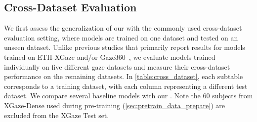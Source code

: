 \begin{table}[t]
    \centering
    \caption{
    Within-dataset evaluation compared with SOTA methods. Note we here follow the train-test split from individual previous works.}
    \label{table:within}
\end{table}



\subsection{Cross-Dataset Evaluation}\label{sec:cross_dataset}

We first assess the generalization of our \methodname with the commonly used cross-dataset evaluation setting, where models are trained on one dataset and tested on an unseen dataset. 
Unlike previous studies that primarily report results for models trained on ETH-XGaze and/or Gaze360~\cite{cheng2022puregaze,xu2023learning,zhao2024improving,liu2021generalizing,liu2022jitter}, we evaluate models trained individually on five different gaze datasets and measure their cross-dataset performance on the remaining datasets. 
In \cref{table:cross_dataset}, each subtable corresponds to a training dataset, with each column representing a different test dataset. 
We compare several baseline models with our \methodname.
Note the 60 subjects from XGaze-Dense used during pre-training (\cref{sec:pretrain_data_prepare}) are excluded from the XGaze Test set.



